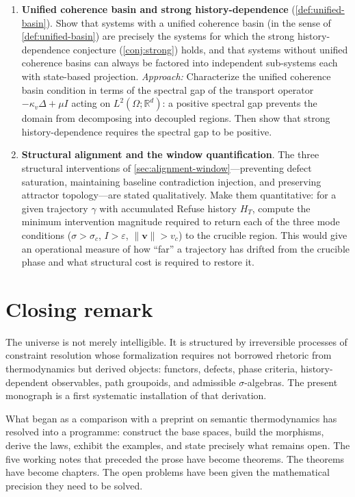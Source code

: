 \documentclass[12pt, oneside]{memoir}
\newcommand{\nnorm}[1]{\lVert #1 \rVert}
\newcommand{\bv}{\mathbf{v}}
\begin{document}
\begin{enumerate}
  \item \textbf{Unified coherence basin and strong history-dependence}
        (\cref{def:unified-basin}).  Show that systems with a unified coherence basin
        (in the sense of \cref{def:unified-basin}) are precisely the systems for which
        the strong history-dependence conjecture (\cref{conj:strong}) holds, and
        that systems without unified coherence basins can always be factored into
        independent sub-systems each with state-based projection.
        \textit{Approach:} Characterize the unified coherence basin condition in terms
        of the spectral gap of the transport operator $-\kappa_v\Delta + \mu I$ acting
        on $L^2(\Omega;\mathbb{R}^d)$: a positive spectral gap prevents the domain from
        decomposing into decoupled regions.  Then show that strong history-dependence
        requires the spectral gap to be positive.

  \item \textbf{Structural alignment and the window quantification}.
        The three structural interventions of \cref{sec:alignment-window}---preventing
        defect saturation, maintaining baseline contradiction injection, and preserving
        attractor topology---are stated qualitatively.  Make them quantitative: for a
        given trajectory $\gamma$ with accumulated Refuse history $H_T$, compute the
        minimum intervention magnitude required to return each of the three mode
        conditions ($\sigma > \sigma_c$, $I > \varepsilon$, $\nnorm{\bv} > v_c$) to the
        crucible region.  This would give an operational measure of how ``far'' a
        trajectory has drifted from the crucible phase and what structural cost is
        required to restore it.
\end{enumerate}

\section{Closing remark}

The universe is not merely intelligible.  It is structured by irreversible processes of
constraint resolution whose formalization requires not borrowed rhetoric from
thermodynamics but derived objects: functors, defects, phase criteria, history-dependent
observables, path groupoids, and admissible $\sigma$-algebras.  The present monograph is
a first systematic installation of that derivation.

What began as a comparison with a preprint on semantic thermodynamics has resolved into
a programme: construct the base spaces, build the morphisms, derive the laws, exhibit the
examples, and state precisely what remains open.  The five working notes that preceded
the prose have become theorems.  The theorems have become chapters.  The open problems
have been given the mathematical precision they need to be solved.
\end{document}
